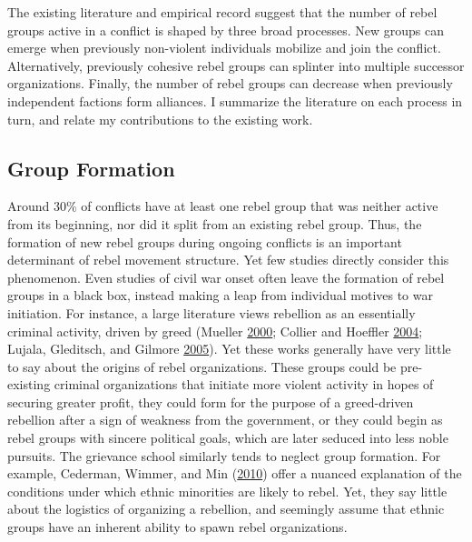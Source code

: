 \documentclass[12pt,]{book}
\theoremstyle{definition}
\theoremstyle{definition}
\theoremstyle{definition}
\theoremstyle{remark}
\begin{document}
The existing literature and empirical record suggest that the number of
rebel groups active in a conflict is shaped by three broad processes.
New groups can emerge when previously non-violent individuals mobilize
and join the conflict. Alternatively, previously cohesive rebel groups
can splinter into multiple successor organizations. Finally, the number
of rebel groups can decrease when previously independent factions form
alliances. I summarize the literature on each process in turn, and
relate my contributions to the existing work.

\hypertarget{group-formation}{%
\subsection{Group Formation}\label{group-formation}}

Around 30\% of conflicts have at least one rebel group that was neither
active from its beginning, nor did it split from an existing rebel
group. Thus, the formation of new rebel groups during ongoing conflicts
is an important determinant of rebel movement structure. Yet few studies
directly consider this phenomenon. Even studies of civil war onset often
leave the formation of rebel groups in a black box, instead making a
leap from individual motives to war initiation. For instance, a large
literature views rebellion as an essentially criminal activity, driven
by greed (Mueller \protect\hyperlink{ref-mueller00}{2000}; Collier and
Hoeffler \protect\hyperlink{ref-Collier2004}{2004}; Lujala, Gleditsch,
and Gilmore \protect\hyperlink{ref-Lujala2005}{2005}). Yet these works
generally have very little to say about the origins of rebel
organizations. These groups could be pre-existing criminal organizations
that initiate more violent activity in hopes of securing greater profit,
they could form for the purpose of a greed-driven rebellion after a sign
of weakness from the government, or they could begin as rebel groups
with sincere political goals, which are later seduced into less noble
pursuits. The grievance school similarly tends to neglect group
formation. For example, Cederman, Wimmer, and Min
(\protect\hyperlink{ref-Cederman2010}{2010}) offer a nuanced explanation
of the conditions under which ethnic minorities are likely to rebel.
Yet, they say little about the logistics of organizing a rebellion, and
seemingly assume that ethnic groups have an inherent ability to spawn
rebel organizations.
\end{document}
